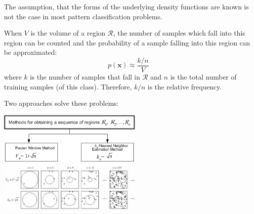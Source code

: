   The assumption, that the forms of the underlying density functions are known is not the case in 
  most pattern classification problems.
  
  
  When $V$ is the volume of a region $\mathcal{R}$, the number of samples which fall into this
  region can be counted and the probability of a sample falling into this region can be 
  approximated:
  $$p(\bm{x}) \approx \frac{k/n}{V}$$
  where $k$ is the number of samples that fall in $\mathcal{R}$ and $n$ is the total number of training
  samples (of this class). Therefore, $k/n$ is the relative frequency.
  
  Two approaches solve these problems:\\
  \begin{center}
    \includegraphics[width=7cm]{./images/non-parametric_methods_1.png}\hspace{0.5cm}
    \includegraphics[width=7cm]{./images/non-parametric_methods_2.jpg}
  \end{center}
    
